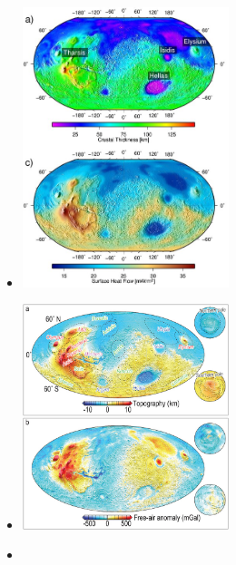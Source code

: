\begin{itemize}
\item {}

\begin{center}
\includegraphics[width=6cm]{images/mars/plpt18}
\end{center}

\item {}

\begin{center}
\includegraphics[width=6cm]{images/mars/dilg19}
\end{center}

\item {}


\end{itemize}
